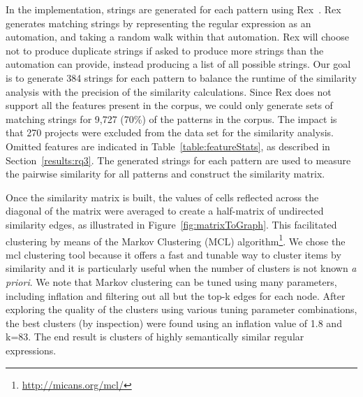 In the implementation, strings are generated for each pattern using Rex~\cite{rex}.
  Rex generates matching strings by representing the regular expression as an automation, and taking a random walk within that automation.  Rex will choose not to produce duplicate strings if asked to produce more strings than the automation can provide, instead producing a list of all possible strings.
Our goal is to generate 384 strings for each pattern to balance the runtime of the similarity analysis with the precision of the similarity calculations.
 Since Rex does not support all the features present in the corpus, we could only generate sets of matching strings for 9,727 (70\%) of the  patterns in the corpus. The impact is that 270 projects were excluded from the data set for the similarity analysis. Omitted features are indicated in Table~\ref{table:featureStats}, as described in Section~\ref{results:rq3}.
The generated strings for each pattern are used to measure the pairwise similarity for all patterns and construct the similarity matrix.

Once the similarity matrix is built, the values of cells reflected across the diagonal of the matrix were averaged to create a half-matrix of undirected similarity edges, as illustrated in Figure~\ref{fig:matrixToGraph}. This facilitated clustering by means of the  Markov Clustering (MCL) algorithm\footnote{\url{http://micans.org/mcl/}}.
We chose the mcl clustering tool because it offers a fast and tunable way to cluster items by similarity and it is particularly useful when the number of clusters is not known \emph{a priori}.
We note that Markov clustering can be tuned using many parameters, including inflation and filtering out all but the top-k edges for each node.  After exploring the quality of the clusters using various tuning parameter combinations, the best clusters (by inspection) were found using an inflation value of 1.8 and k=83.
The end result is clusters of highly semantically similar regular expressions.



